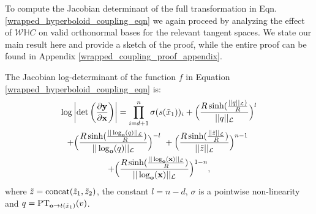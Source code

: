 
To compute the Jacobian determinant of the full transformation in Eqn. \ref{wrapped_hyperboloid_coupling_eqn} we again proceed by analyzing the effect of $\mathcal{W}\mathbb{H}C$ on valid orthonormal bases for the relevant tangent spaces. We state our main result here and provide a sketch of the proof, while the entire proof can be found in Appendix \ref{wrapped_coupling_proof_appendix}. 
\begin{prop}
The Jacobian log-determinant of the function $f$ in Equation \eqref{wrapped_hyperboloid_coupling_eqn} is:
\begin{multline}
  \log \left|\textnormal{det}\left(\frac{\partial\mb{y}}{\partial \mb{x}}\right)\right| = \prod_{i=d+1}^n\sigma(s(\tilde{x}_1))_i + \Big(\frac{R \sinh(\frac{||q||_{\mathcal{L}})}{R}}{||q||_{\mathcal{L}}}\Big)^{l} \\
  + \Big(\frac{R\sinh(\frac{||\log_{\textbf{o}}(q)||_{\mathcal{L}}}{R})}{||\log_{\textbf{o}}(q)||_{\mathcal{L}}}\Big)^{-l} \ +  \Big(\frac{R\sinh(\frac{||\tilde{z}||_{\mathcal{L}}}{R})}{||\tilde{z}||_{\mathcal{L}}}\Big)^{n-1}
 \  \\ + \Big(\frac{R\sinh(\frac{||\log_{\textbf{o}}(\textbf{x})||_{\mathcal{L}}}{R})}{||\log_{\textbf{o}}(\textbf{x})||_{\mathcal{L}}}\Big)^{1-n},
\end{multline}
where $\tilde{z} = \textnormal{concat}(\tilde{z}_1, \tilde{z}_2)$, the constant $l = n-d$, $\sigma$ is a pointwise non-linearity 
and $q = \textnormal{PT}_{\textbf{o}\to t(\tilde{x}_1) }(v)$.
\end{prop}

